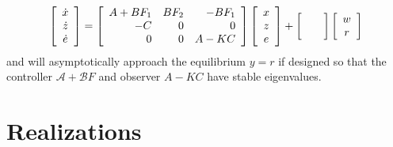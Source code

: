 \documentclass{report}
\begin{document}
$$
\left[\begin{array}{c}
  \dot{x} \\
  \dot{z} \\
  \dot{e}
\end{array}\right] =
\left[\begin{array}{r r r}
  A + B F_1 & B F_2 & -B F_1 \\
  -C        & 0     &  0     \\
   0        & 0     &  A - K C
\end{array}\right]
\left[\begin{array}{c}
  x \\
  z \\
  e
\end{array}\right]
+
\left[\begin{array}{c}
  \quad \\
  \quad
\end{array}\right]
\left[\begin{array}{c}
  w \\
  r
\end{array}\right]
$$
and will asymptotically approach the equilibrium $y = r$ if designed
so that the controller $\mathcal{A} + \mathcal{B} F$ and
observer $A - K C$ have stable eigenvalues.

\section{Realizations}
\end{document}
